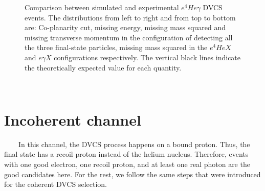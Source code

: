 \begin{figure}[h!]
\caption{Comparison between simulated and experimental $e^{4}He\gamma$ DVCS events. The distributions from left to right and from top to bottom are: Co-planarity cut, missing energy, missing mass squared and missing transverse momentum in the configuration of detecting all the three final-state particles, missing mass squared in the $e^{4}HeX$ and $e\gamma X$ configurations respectively. The vertical black lines indicate the theoretically expected value for each quantity.} 
\label{fig:coh_comparison_with_simulation_2}
\end{figure}

  

~\newpage
~\newpage

\section{Incoherent channel}
~~~~In this channel, the DVCS process happens on a bound proton. Thus, the 
final state has a recoil proton instead of the helium nucleus. Therefore, 
events with one good electron, one recoil proton, and at least one real photon 
are the good candidates here. For the rest, we follow the same steps that were 
introduced for the coherent DVCS selection.

